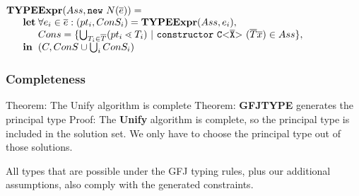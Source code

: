 \documentclass[acmsmall,screen,review]{acmart}
\begin{document}
\smallskip

$\begin{array}{@{}l@{}l@{}l}
\textbf{TY}& \textbf{PE} & \textbf{Expr} (Ass, \mathtt{new }\ N(\overline{e}) ) = \\
& \textbf{let} %
& \forall e_i \in \overline{e} : (pt_i, ConS_i) = \textbf{TYPEExpr}(Ass, e_i)  ,\\
& & Cons = \{ \bigcup_{T_i \in \overline{T}} (pt_i \lessdot T_i) \ | \ \mathtt{constructor }\ \exptype{C}{\ol{X}}(\overline{T} \overline{x}) \in Ass \},\\
& \mathbf{in}%
& (C, ConS \cup \bigcup_i ConS_i)\\
\end{array}
$

\subsubsection{Completeness}
Theorem: The Unify algorithm is complete
Theorem: \textbf{GFJTYPE} generates the principal type
Proof: The \textbf{Unify} algorithm is complete, so the principal type is included in the solution set.
We only have to choose the principal type out of those solutions.

All types that are possible under the GFJ typing rules, plus our additional assumptions,
also comply with the generated constraints.
\end{document}
